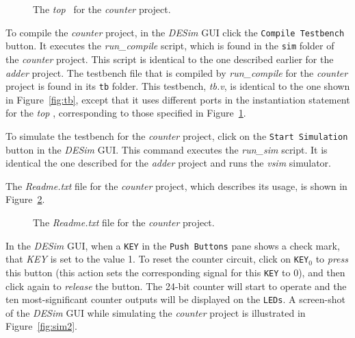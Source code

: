 {\begin{figure}[h]
\begin{center}
\begin{minipage}[h]{15 cm}
	{}
	{}
\end{minipage}
	\caption{The {\it top} \hdlModuleName~for the {\it counter} project.}
	\label{fig:counter_top}
\end{center}
\end{figure}

To compile the {\it counter} project, in the {\it DESim} GUI click the \texttt{Compile Testbench}
button. It executes the {\it run\_compile} script, which
is found in the \texttt{sim} folder of the {\it counter} project. This script 
is identical to the one described earlier for the {\it adder} project. 
The testbench file that is compiled by {\it run\_compile} for the {\it counter} project is  
found in its \texttt{tb} folder. This testbench, {\it tb.v}, is identical to the one shown 
in Figure~\ref{fig:tb}, except that it uses different ports in the instantiation statement
for the {\it top} \hdlModuleName, corresponding to those specified in 
Figure~\ref{fig:counter_top}.

To simulate the testbench for the {\it counter} project, click on the
\texttt{Start Simulation} button in the {\it DESim} GUI. This command executes the
{\it run\_sim} script. It is identical the one described for the 
{\it adder} project and runs the {\it vsim} simulator.

The {\it Readme.txt} file for the {\it counter} project, which describes its usage,
is shown in Figure~\ref{fig:readme_counter}. 

\begin{figure}[H]
\begin{center}
\begin{minipage}[t]{15 cm}
	
\end{minipage}
    \caption{The {\it Readme.txt} file for the {\it counter} project.}
	\label{fig:readme_counter}
\end{center}
\end{figure}

In the {\it DESim} GUI, when a \texttt{KEY} in the \texttt{Push Buttons} pane shows a check mark,
that {\it KEY} is set to the value 1. To reset the counter circuit, 
click on \texttt{KEY}$_0$ to {\it press} this button (this action sets the corresponding 
signal for this \texttt{KEY} to 0), and then click again to {\it release} the button. 
The 24-bit counter will start to operate and the ten
most-significant counter outputs will be displayed on the \texttt{LEDs}. A screen-shot of
the {\it DESim} GUI while simulating the {\it counter} project is illustrated in 
Figure~\ref{fig:sim2}.

}

